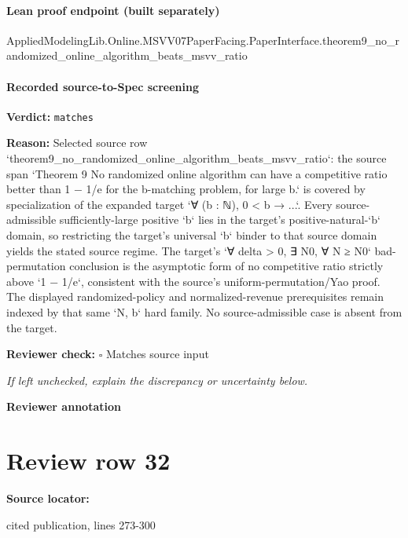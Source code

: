 \documentclass[10pt]{article}
\newcommand{\reviewerbox}{%
  \par\noindent\fbox{\parbox{0.96\linewidth}{\rule{0pt}{0.38in}}}\par
}
\newcommand{\reviewmatch}[1]{%
  \par\noindent\textbf{Reviewer check:} $\square$\; #1\par
  \noindent\emph{If left unchecked, explain the discrepancy or uncertainty below.}\par
}
\begin{document}
\paragraph{Lean proof endpoint (built separately)}\begin{ReviewVerbatim}
AppliedModelingLib.Online.MSVV07PaperFacing.PaperInterface.theorem9_no_randomized_online_algorithm_beats_msvv_ratio
\end{ReviewVerbatim}

\paragraph{Recorded source-to-Spec screening}
\textbf{Verdict:} \texttt{matches}
\\
{\raggedright
\textbf{Reason:} Selected source row `theorem9\_\allowbreak{}no\_\allowbreak{}randomized\_\allowbreak{}online\_\allowbreak{}algorithm\_\allowbreak{}beats\_\allowbreak{}msvv\_\allowbreak{}ratio`:\allowbreak{} the source span `Theorem 9 No randomized online algorithm can have a competitive ratio better than 1 − 1/\allowbreak{}e for the b-\allowbreak{}matching problem, for large b.\allowbreak{}` is covered by specialization of the expanded target `∀ (b :\allowbreak{} ℕ), 0 < b → .\allowbreak{}.\allowbreak{}.\allowbreak{}`.\allowbreak{} Every source-\allowbreak{}admissible sufficiently-\allowbreak{}large positive `b` lies in the target's positive-\allowbreak{}natural-\allowbreak{}`b` domain, so restricting the target's universal `b` binder to that source domain yields the stated source regime.\allowbreak{} The target's `∀ delta > 0, ∃ N0, ∀ N ≥ N0` bad-\allowbreak{}permutation conclusion is the asymptotic form of no competitive ratio strictly above `1 − 1/\allowbreak{}e`, consistent with the source's uniform-\allowbreak{}permutation/\allowbreak{}Yao proof.\allowbreak{} The displayed randomized-\allowbreak{}policy and normalized-\allowbreak{}revenue prerequisites remain indexed by that same `N, b` hard family.\allowbreak{} No source-\allowbreak{}admissible case is absent from the target.\allowbreak{}
\par}
\reviewmatch{Matches source input}
\noindent\textbf{Reviewer annotation}\par
\reviewerbox
\clearpage
\hypertarget{source-claim-baeba03c02061049}{}
\section*{Review row 32}
\textbf{Source locator:} {\footnotesize\raggedright cited publication, lines 273-\allowbreak{}300\par}
\end{document}
